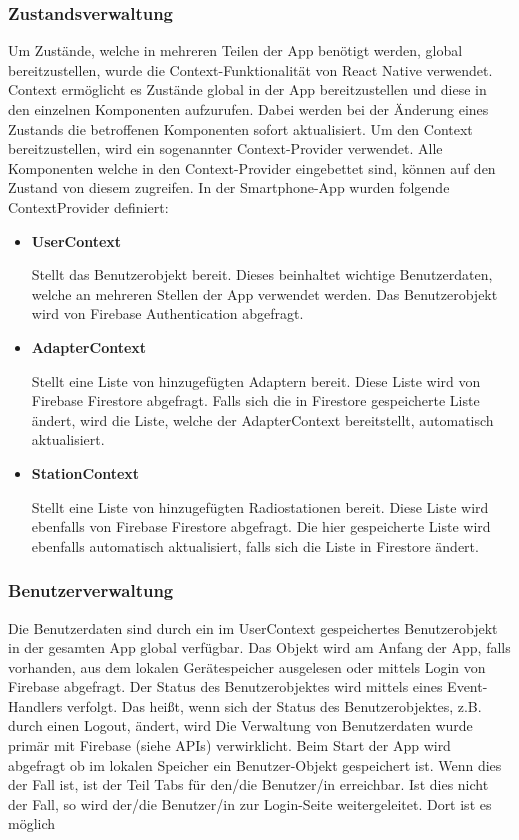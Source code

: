 \documentclass[11pt, twoside]{article}
\begin{document}
\subsubsection{Zustandsverwaltung}
Um Zustände, welche in mehreren Teilen der App benötigt werden, global bereitzustellen, wurde die Context-Funktionalität von React Native verwendet. Context ermöglicht es Zustände global in der App bereitzustellen und diese in den einzelnen Komponenten aufzurufen. Dabei werden bei der Änderung eines Zustands die betroffenen Komponenten sofort aktualisiert. Um den Context bereitzustellen, wird ein sogenannter Context-Provider verwendet. Alle Komponenten welche in den Context-Provider eingebettet sind, können auf den Zustand von diesem zugreifen. \parencite[vgl.][]{noauthor_urlpi23_nodate} In der Smartphone-App wurden folgende ContextProvider definiert:
\begin{itemize}
	\item \textbf{UserContext}
	\par Stellt das Benutzerobjekt bereit. Dieses beinhaltet wichtige Benutzerdaten, welche an mehreren Stellen der App verwendet werden. Das Benutzerobjekt wird von Firebase Authentication abgefragt.
	\item \textbf{AdapterContext}
	\par Stellt eine Liste von hinzugefügten Adaptern bereit. Diese Liste wird von Firebase Firestore abgefragt. Falls sich die in Firestore gespeicherte Liste ändert, wird die Liste, welche der AdapterContext bereitstellt, automatisch aktualisiert. 
	\item \textbf{StationContext}
	\par Stellt eine Liste von hinzugefügten Radiostationen bereit. Diese Liste wird ebenfalls von Firebase Firestore abgefragt. Die hier gespeicherte Liste wird ebenfalls automatisch aktualisiert, falls sich die Liste in Firestore ändert.
\end{itemize}
\subsubsection{Benutzerverwaltung}
Die Benutzerdaten sind durch ein im UserContext gespeichertes Benutzerobjekt in der gesamten App global verfügbar. Das Objekt wird am Anfang der App, falls vorhanden, aus dem lokalen Gerätespeicher ausgelesen oder mittels Login von Firebase abgefragt. Der Status des Benutzerobjektes wird mittels eines Event-Handlers verfolgt. Das heißt, wenn sich der Status des Benutzerobjektes, z.B. durch einen Logout, ändert, wird 
Die Verwaltung von Benutzerdaten wurde primär mit Firebase (siehe APIs) verwirklicht. Beim Start der App wird abgefragt ob im lokalen Speicher ein Benutzer-Objekt gespeichert ist. Wenn dies der Fall ist, ist der Teil Tabs für den/die Benutzer/in erreichbar. Ist dies nicht der Fall, so wird der/die Benutzer/in zur Login-Seite weitergeleitet. Dort ist es möglich 
\end{document}

